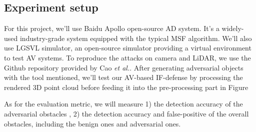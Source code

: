\subsection{Experiment setup}

For this project, we’ll use Baidu Apollo\cite{apollo} open-source AD
system. It’s a widely-used industry-grade system equipped
with the typical MSF algorithm. We’ll also use LGSVL simulator\cite{lgsvl}, an
open-source simulator providing a virtual environment to test
AV systems. To reproduce the attacks on camera and LiDAR,
we use the Github repository\cite{msf-adv} provided by Cao \emph{et al.}. After
generating adversarial objects with the tool mentioned, we’ll
test our AV-based IF-defense\cite{if-defense} by processing the rendered 3D point cloud before feeding it into the pre-processing part in Figure

As for the evaluation metric, we will measure 1) the detection accuracy of the adversarial obstacles
, 2) the detection accuracy and false-positive of the overall obstacles, including the benign ones and adversarial ones.

